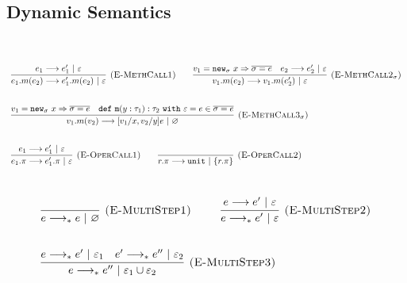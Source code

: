 \documentclass{llncs}
\newcommand{\keywadj}[1]{\mathtt{#1}}
\newcommand{\keyw}[1]{\keywadj{#1}~}
\begin{document}
\subsection{Dynamic Semantics}

~\\


\[
\begin{array}{lll}

	\infer[\textsc{(E-MethCall1)}]
		{e_1.m(e_2) \longrightarrow e_1'.m(e_2)~|~\varepsilon}
		{e_1 \longrightarrow e_1'~|~\varepsilon}

		~~~~~~

	\infer[\textsc{(E-MethCall2$_{\sigma}$)}]
		{v_1.m(e_2) \longrightarrow v_1.m(e_2')~|~\varepsilon}
		{v_1 = \keywadj{new}_{\sigma}~x \Rightarrow \overline{\sigma = e} & e_2 \longrightarrow e_2'~|~\varepsilon}\\[5ex]
				
		
	\infer[\textsc{(E-MethCall3$_{\sigma}$)}]
		{v_1.m(v_2)
			\longrightarrow
		 [v_1/x, v_2/y]e~|~\varnothing}
  		{v_1 = \keywadj{new}_{\sigma}~x \Rightarrow \overline{\sigma = e} & \keywadj{def~m}(y: \tau_1) : \tau_2~\keyw{with} \varepsilon = e \in \overline {\sigma = e}} \\[5ex]

	\infer[\textsc{(E-OperCall1)}]
		{e_1.\pi
			\longrightarrow
		 e_1'.\pi~|~\varepsilon}
		{e_1 \longrightarrow e_1'~|~\varepsilon}
~~~~~~

			\infer[\textsc{(E-OperCall2)}]
		{r.\pi
			\longrightarrow
		 \keywadj{unit}~|~\{r.\pi\}}
		{} \\[5ex]
			
\end{array}
\]




\[
\begin{array}{lll}

	\infer[\textsc{(E-MultiStep1)}]
	{e \longrightarrow_* e~|~\varnothing}
	{} ~~~~~~~~
	
	\infer[\textsc{(E-MultiStep2)}]
	{e \longrightarrow_* e'~|~\varepsilon}
	{e \longrightarrow e'~|~\varepsilon} \\[5ex]

	\infer[\textsc{(E-MultiStep3)}]
	{e \longrightarrow_* e''~|~\varepsilon_1 \cup \varepsilon_2}
	{e \longrightarrow_* e'~|~\varepsilon_1 & e' \longrightarrow_* e''~|~\varepsilon_2}

\end{array}
\]
\end{document}
